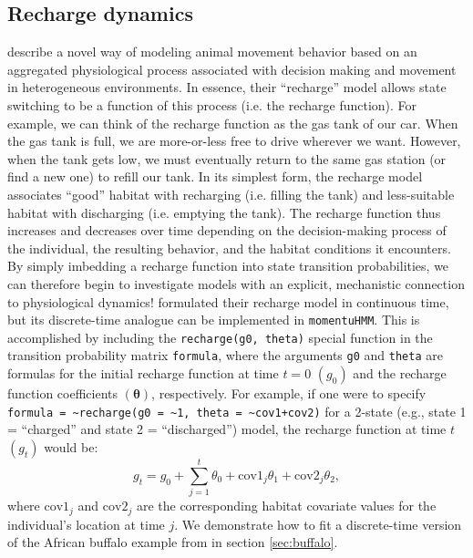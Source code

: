 \documentclass[12pt]{article}\usepackage[]{graphicx}\usepackage[]{color}
\begin{document}
\subsection{Recharge dynamics}
\label{sec:recharge}
\cite{HootenEtAl2019} describe a novel way of modeling animal movement behavior based on an aggregated physiological process associated with decision making and movement in heterogeneous environments. In essence, their ``recharge'' model allows state switching to be a function of this process (i.e. the recharge function). For example, we can think of the recharge function as the gas tank of our car. When the gas tank is full, we are more-or-less free to drive wherever we want. However, when the tank gets low, we must eventually return to the same gas station (or find a new one) to refill our tank. In its simplest form, the recharge model associates ``good'' habitat with recharging (i.e. filling the tank) and less-suitable habitat with discharging (i.e. emptying the tank). The recharge function thus increases and decreases over time depending on the decision-making process of the individual, the resulting behavior, and the habitat conditions it encounters. By simply imbedding a recharge function into state transition probabilities, we can therefore begin to investigate models with an explicit, mechanistic connection to physiological dynamics! \cite{HootenEtAl2019} formulated their recharge model in continuous time, but its discrete-time analogue can be implemented in \verb|momentuHMM|. This is accomplished by including the \verb|recharge(g0, theta)| special function in the transition probability matrix \verb|formula|, where the arguments \verb|g0| and \verb|theta| are formulas for the initial recharge function at time $t=0$ $(g_0)$ and the recharge function coefficients $({\boldsymbol \theta})$, respectively. For example, if one were to specify \verb|formula = ~recharge(g0 = ~1, theta = ~cov1+cov2)| for a 2-state (e.g., state 1 = ``charged'' and state 2 = ``discharged'') model, the recharge function at time $t$ $(g_t)$ would be:
\begin{equation*}
  g_t = g_0 + \sum_{j=1}^t \theta_0 + \text{cov1}_j \theta_1 + \text{cov2}_j \theta_2,
\end{equation*}
where $\text{cov1}_j$ and $\text{cov2}_j$ are the corresponding habitat covariate values for the individual's location at time $j$. We demonstrate how to fit a discrete-time version of the African buffalo example from \cite{HootenEtAl2019} in section \ref{sec:buffalo}. 
\end{document}
